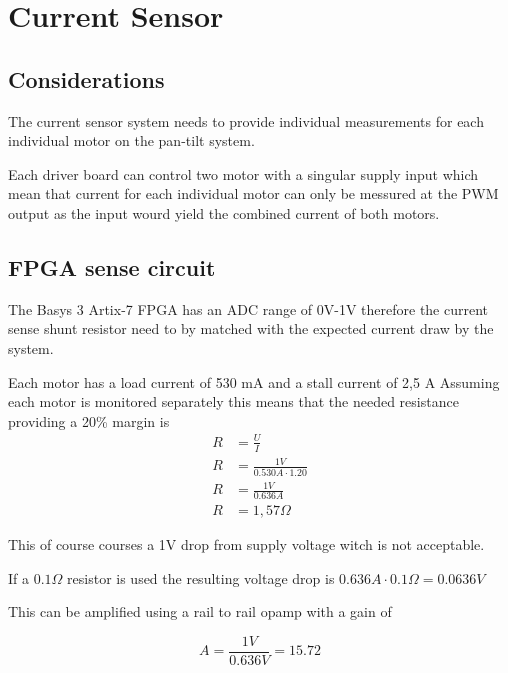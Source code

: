 \documentclass[../main]{subfiles}
\begin{document}
\section*{Current Sensor}

\subsection*{Considerations}

The current sensor system needs to provide individual measurements for each individual motor on the pan-tilt system.

Each driver board can control two motor with a singular supply input which mean that current for each individual motor can only be messured at the PWM output as the input wourd yield the combined current of both motors.



\subsection*{FPGA sense circuit}

The Basys 3 Artix-7 FPGA has an ADC range of 0V-1V therefore the current sense shunt resistor need to by matched with the expected current draw by the system.

Each motor has a load current of 530 mA and a stall current of 2,5 A
Assuming each motor is monitored separately this means that the needed resistance providing a 20\% margin is
\begin{equation*}
  \begin{split}
    R&=\frac{U}{I}\\
    R&=\frac{1V}{0.530A\cdot1.20} \\
    R&=\frac{1V}{0.636A} \\
    R&=1,57\Omega
  \end{split}
\end{equation*}

This of course courses a 1V drop from supply voltage witch is not acceptable.

If a $0.1\Omega$ resistor is used the resulting voltage drop is $0.636A\cdot0.1\Omega = 0.0636V$

This can be amplified using a rail to rail opamp with a gain of

$$
A = \frac{1V}{0.636V} = 15.72
$$
\end{document}

